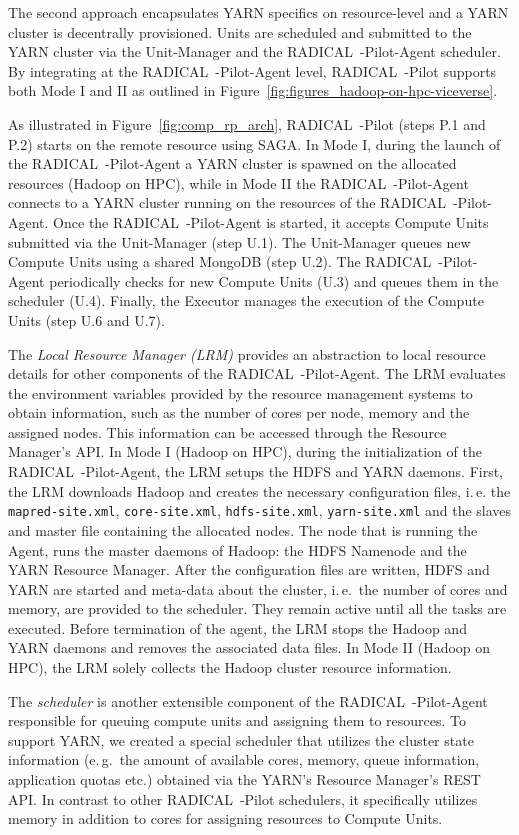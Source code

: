 The second approach encapsulates YARN specifics on resource-level and a YARN cluster is decentrally provisioned.
Units are scheduled and submitted to the YARN cluster via the Unit-Manager and the RADICAL~-Pilot-Agent scheduler.
By integrating at the RADICAL~-Pilot-Agent level, RADICAL~-Pilot supports both Mode I and II as outlined in Figure~\ref{fig:figures_hadoop-on-hpc-viceverse}.

As illustrated in Figure~\ref{fig:comp_rp_arch}, RADICAL~-Pilot  (steps P.1 and P.2) starts on the remote resource using SAGA.
In Mode I, during the launch of the RADICAL~-Pilot-Agent a YARN cluster is spawned on the allocated resources (Hadoop on HPC), while in Mode II the RADICAL~-Pilot-Agent connects to a YARN cluster running on the resources of the RADICAL~-Pilot-Agent.
Once the RADICAL~-Pilot-Agent is started, it accepts Compute Units submitted via the Unit-Manager (step U.1).
The Unit-Manager queues new Compute Units using a shared MongoDB (step U.2).
The RADICAL~-Pilot-Agent periodically checks for new Compute Units (U.3) and queues them in the scheduler (U.4).
Finally, the Executor manages the execution of the Compute Units (step U.6 and U.7).

The \emph{Local Resource Manager (LRM)} provides an abstraction to local resource details for other components of the RADICAL~-Pilot-Agent.
The LRM evaluates the environment variables provided by the resource management systems to obtain information, such as the number of cores per node, memory and the assigned nodes.
This information can be accessed through the Resource Manager's API.
In Mode I (Hadoop on HPC), during the initialization of the RADICAL~-Pilot-Agent, the LRM setups the HDFS and YARN daemons.
First, the LRM downloads Hadoop and creates the necessary configuration files, i.\,e. the \texttt{mapred-site.xml}, \texttt{core-site.xml}, \texttt{hdfs-site.xml}, \texttt{yarn-site.xml} and the slaves and master file containing the allocated nodes.
The node that is running the Agent, runs the master daemons of Hadoop: the HDFS Namenode and the YARN Resource Manager.
After the configuration files are written, HDFS and YARN are started and meta-data about the cluster, i.\,e.\ the number of cores and memory, are provided to the scheduler.
They remain active until all the tasks are executed.
Before termination of the agent, the LRM stops the Hadoop and YARN daemons and removes the associated data files.
In Mode II (Hadoop on HPC), the LRM solely collects the Hadoop cluster resource information.

The \emph{scheduler} is another extensible component of the RADICAL~-Pilot-Agent responsible for queuing compute units and assigning them to resources.
To support YARN, we created a special scheduler that utilizes the cluster state information (e.\,g.\ the amount of available cores, memory, queue information, application quotas etc.) obtained via the YARN's Resource Manager's REST API.
In contrast to other RADICAL~-Pilot schedulers, it specifically utilizes memory in addition to cores for assigning resources to Compute Units.

